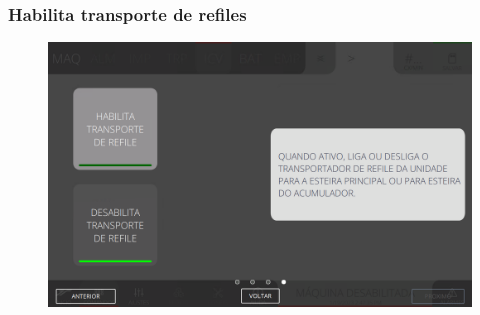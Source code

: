 \newpage
\thispagestyle{fancy}
\vspace*{40 pt}
\subsubsection{\small{Habilita transporte de refiles}} \label{sec:comandosCorteVincoHabilitaTransporteRefiles}
\vspace*{\fill}
\begin{figure}[h]
    \centering
    \includegraphics[width=576 px,height=360 px]{src/imagesICV/06-dryCutter/commands/e-4.png}
\end{figure}
\vspace*{\fill}